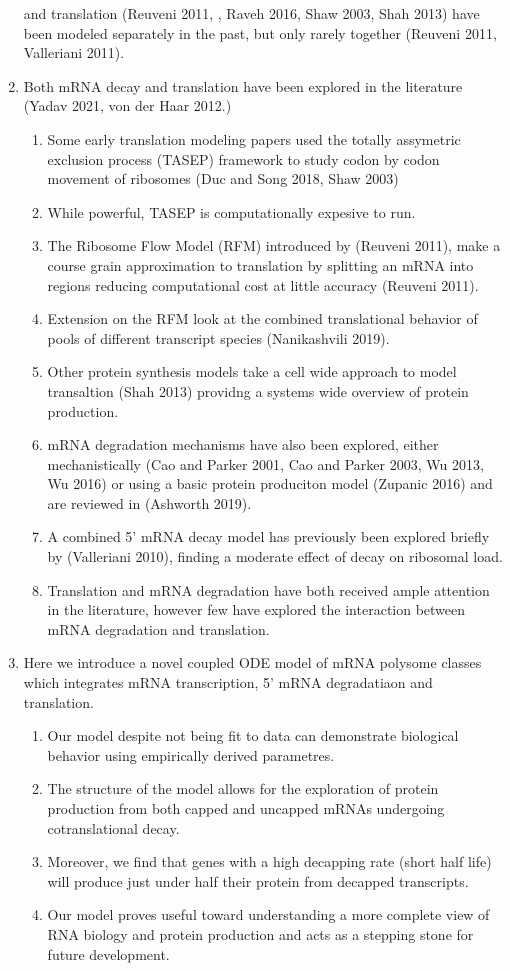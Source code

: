 \documentclass[review]{elsarticle}
\begin{document}
\begin{enumerate}
 and translation (Reuveni 2011, , Raveh 2016, Shaw 2003, Shah 2013) have been modeled separately in the past, but only rarely together (Reuveni 2011, Valleriani 2011).
\item Both mRNA decay and translation have been explored in the literature (Yadav 2021, von der Haar 2012.)
\begin{enumerate}	
  \item Some early translation modeling papers used the totally assymetric exclusion process (TASEP) framework to study codon by codon movement of ribosomes (Duc and Song 2018, Shaw 2003)
  \item While powerful, TASEP is computationally expesive to run. 
  \item The Ribosome Flow Model (RFM) introduced by (Reuveni 2011), make a course grain approximation to translation by splitting an mRNA into regions reducing computational cost at little accuracy (Reuveni 2011).
  \item Extension on the RFM look at the combined translational behavior of pools of different transcript species (Nanikashvili 2019).
  \item Other protein synthesis models take a cell wide approach to model transaltion (Shah 2013) providng a systems wide overview of protein production.
  \item mRNA degradation mechanisms have also been explored, either mechanistically (Cao and Parker 2001, Cao and Parker 2003, Wu 2013, Wu 2016) or using a basic protein produciton model (Zupanic 2016) and are reviewed in (Ashworth 2019).
  \item A combined 5' mRNA decay model has previously been explored briefly by (Valleriani 2010), finding a moderate effect of decay on ribosomal load.
  \item Translation and mRNA degradation have both received ample attention in the literature, however few have explored the interaction between mRNA degradation and translation.
\end{enumerate}

\item Here we introduce a novel coupled ODE model of mRNA polysome classes which integrates mRNA transcription, 5' mRNA degradatiaon and translation.
\begin{enumerate}	
  \item Our model despite not being fit to data can demonstrate biological behavior using empirically derived parametres.
  \item The structure of the model allows for the exploration of protein production from both capped and uncapped mRNAs undergoing cotranslational decay.
  \item Moreover, we find that genes with a high decapping rate (short half life) will produce just under half their protein from decapped transcripts. 
  \item Our model proves useful toward understanding a more complete view of RNA biology and protein production and acts as a stepping stone for future development.

\end{enumerate}

\end{enumerate}
\end{document}
